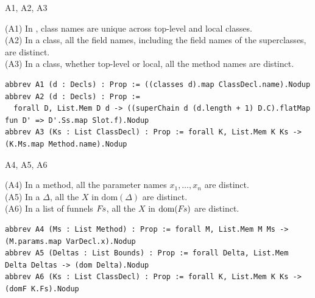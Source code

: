 \begin{cmp}{A1, A2, A3}
\begin{paperside}
(A1) In \decls, class names are unique across top-level and local classes.\\
(A2) In a class, all the field names, including the field names of the superclasses, are distinct.\\
(A3) In a class, whether top-level or local, all the method names are distinct.
\end{paperside}
\begin{leanside}
\begin{lstlisting}[style=leanside]
abbrev A1 (d : Decls) : Prop := ((classes d).map ClassDecl.name).Nodup
abbrev A2 (d : Decls) : Prop :=
  forall D, List.Mem D d -> ((superChain d (d.length + 1) D.C).flatMap fun D' => D'.Ss.map Slot.f).Nodup
abbrev A3 (Ks : List ClassDecl) : Prop := forall K, List.Mem K Ks -> (K.Ms.map Method.name).Nodup
\end{lstlisting}
\end{leanside}
\end{cmp}

\begin{cmp}{A4, A5, A6}
\begin{paperside}
(A4) In a method, all the parameter names $x_1,\ldots,x_n$ are distinct.\\
(A5) In a $\Delta$, all the $X$ in $\mathrm{dom}(\Delta)$ are distinct.\\
(A6) In a list of funnels $F\mkern-2mu s$, all the $X$ in $\mathrm{dom}(F\mkern-2mu s)$ are distinct.
\end{paperside}
\begin{leanside}
\begin{lstlisting}[style=leanside]
abbrev A4 (Ms : List Method) : Prop := forall M, List.Mem M Ms -> (M.params.map VarDecl.x).Nodup
abbrev A5 (Deltas : List Bounds) : Prop := forall Delta, List.Mem Delta Deltas -> (dom Delta).Nodup
abbrev A6 (Ks : List ClassDecl) : Prop := forall K, List.Mem K Ks -> (domF K.Fs).Nodup
\end{lstlisting}
\end{leanside}
\end{cmp}

